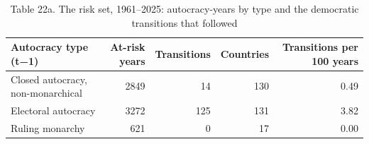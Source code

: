 \begin{table}
\caption{Table 22a. The risk set, 1961–2025: autocracy-years by type and the democratic transitions that followed}
\label{tab:T22a_risk_set}
\begin{tabular}{lrrrr}
\toprule
Autocracy type (t−1) & At-risk years & Transitions & Countries & Transitions per 100 years \\
\midrule
Closed autocracy, non-monarchical & 2849 & 14 & 130 & 0.49 \\
Electoral autocracy & 3272 & 125 & 131 & 3.82 \\
Ruling monarchy & 621 & 0 & 17 & 0.00 \\
\bottomrule
\end{tabular}
\end{table}
